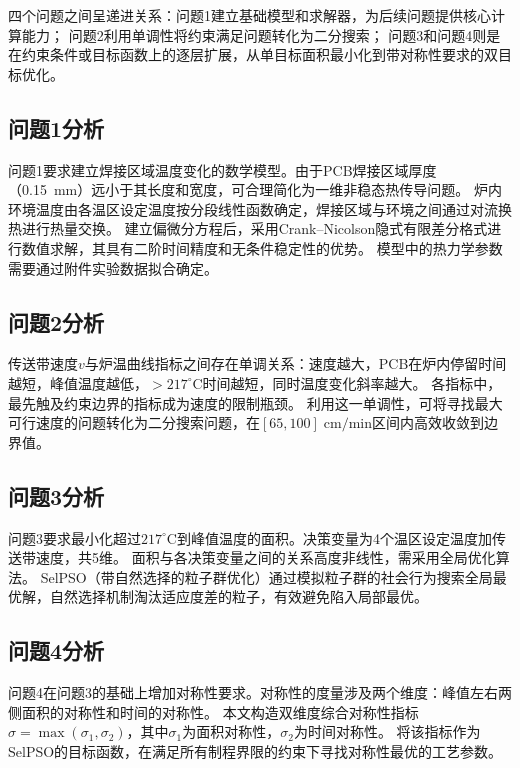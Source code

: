 \documentclass[12pt,a4paper]{ctexart}
\begin{document}
四个问题之间呈递进关系：问题1建立基础模型和求解器，为后续问题提供核心计算能力；
问题2利用单调性将约束满足问题转化为二分搜索；
问题3和问题4则是在约束条件或目标函数上的逐层扩展，从单目标面积最小化到带对称性要求的双目标优化。

\subsection{问题1分析}

问题1要求建立焊接区域温度变化的数学模型。由于PCB焊接区域厚度（0.15~mm）远小于其长度和宽度，可合理简化为一维非稳态热传导问题。
炉内环境温度由各温区设定温度按分段线性函数确定，焊接区域与环境之间通过对流换热进行热量交换。
建立偏微分方程后，采用Crank--Nicolson隐式有限差分格式进行数值求解，其具有二阶时间精度和无条件稳定性的优势。
模型中的热力学参数需要通过附件实验数据拟合确定。

\subsection{问题2分析}

传送带速度$v$与炉温曲线指标之间存在单调关系：速度越大，PCB在炉内停留时间越短，峰值温度越低，$>$$217^{\circ}\mathrm{C}$时间越短，同时温度变化斜率越大。
各指标中，最先触及约束边界的指标成为速度的限制瓶颈。
利用这一单调性，可将寻找最大可行速度的问题转化为二分搜索问题，在$[65,100]\;\mathrm{cm/min}$区间内高效收敛到边界值。

\subsection{问题3分析}

问题3要求最小化超过$217^{\circ}\mathrm{C}$到峰值温度的面积。决策变量为4个温区设定温度加传送带速度，共5维。
面积与各决策变量之间的关系高度非线性，需采用全局优化算法。
SelPSO（带自然选择的粒子群优化）通过模拟粒子群的社会行为搜索全局最优解，自然选择机制淘汰适应度差的粒子，有效避免陷入局部最优。

\subsection{问题4分析}

问题4在问题3的基础上增加对称性要求。对称性的度量涉及两个维度：峰值左右两侧面积的对称性和时间的对称性。
本文构造双维度综合对称性指标$\sigma=\max(\sigma_1,\sigma_2)$，其中$\sigma_1$为面积对称性，$\sigma_2$为时间对称性。
将该指标作为SelPSO的目标函数，在满足所有制程界限的约束下寻找对称性最优的工艺参数。
\end{document}
